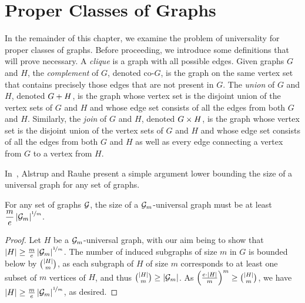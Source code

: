 \section{Proper Classes of Graphs}
\label{sec-graphs-proper}

In the remainder of this chapter, we examine the problem of universality for proper classes of graphs. Before proceeding, we introduce some definitions that will prove necessary. A \emph{clique} is a graph with all possible edges. Given graphs $G$ and $H$, the \emph{complement} of $G$, denoted co-$G$, is the graph on the same vertex set that contains precisely those edges that are not present in $G$. The \emph{union} of $G$ and $H$, denoted $G + H$, is the graph whose vertex set is the disjoint union of the vertex sets of $G$ and $H$ and whose edge set consists of all the edges from both $G$ and $H$. Similarly, the \emph{join} of $G$ and $H$, denoted $G \times H$, is the graph whose vertex set is the disjoint union of the vertex sets of $G$ and $H$ and whose edge set consists of all the edges from both $G$ and $H$ as well as every edge connecting a vertex from $G$ to a vertex from $H$.

In~\cite{alstrup:small-induced-universal:}, Alstrup and Rauhe present a simple  argument lower bounding the size of a universal graph for any set of graphs.
\begin{observation}
\label{obs-alstrup-rauhe}
	For any set of graphs $\mathcal{G}$, the size of a $\mathcal{G}_m$-universal graph must be at least $\dfrac{m}{e} \left\lvert{ \mathcal{G}_m}\right\rvert^{\nicefrac{1}{m}}$.
\end{observation}
\begin{proof}
	Let $H$ be a $\mathcal{G}_m$-universal graph, with our aim being to show that $\left\lvert{H}\right\rvert \ge \frac{m}{e} \left\lvert{ \mathcal{G}_m}\right\rvert^{\nicefrac{1}{m}}$. The number of induced subgraphs of size $m$ in $G$ is bounded below by $\binom{\left\lvert{H}\right\rvert}{m}$, as each subgraph of $H$ of size $m$ corresponds to at least one subset of $m$ vertices of $H$, and thus $\binom{\left\lvert{H}\right\rvert}{m} \ge \left\lvert{ \mathcal{G}_m}\right\rvert$. As $\left(\frac{e \cdot \left\lvert{H}\right\rvert}{m}\right)^m \ge \binom{\left\lvert{H}\right\rvert}{m}$, we have $\left\lvert{H}\right\rvert \ge \frac{m}{e} \left\lvert{ \mathcal{G}_m}\right\rvert^{\nicefrac{1}{m}}$, as desired.
\end{proof}


